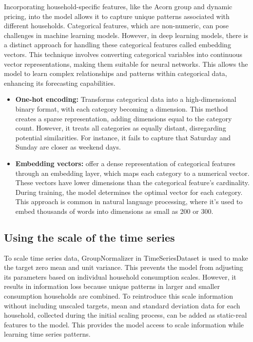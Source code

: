 \documentclass{article}
\begin{document}
Incorporating household-specific features, like the Acorn group and dynamic pricing, into the model allows it to capture unique patterns associated with different households. Categorical features, which are non-numeric, can pose challenges in machine learning models. However, in deep learning models, there is a distinct approach for handling these categorical features called embedding vectors. This technique involves converting categorical variables into continuous vector representations, making them suitable for neural networks. This allows the model to learn complex relationships and patterns within categorical data, enhancing its forecasting capabilities.
\begin{itemize}
    \item \textbf{One-hot encoding: } Transforms categorical data into a high-dimensional binary format, with each category becoming a dimension. This method creates a sparse representation, adding dimensions equal to the category count. However, it treats all categories as equally distant, disregarding potential similarities. For instance, it fails to capture that Saturday and Sunday are closer as weekend days.
    \item \textbf{Embedding vectors: } offer a dense representation of categorical features through an embedding layer, which maps each category to a numerical vector. These vectors have lower dimensions than the categorical feature's cardinality. During training, the model determines the optimal vector for each category. This approach is common in natural language processing, where it's used to embed thousands of words into dimensions as small as 200 or 300.
\end{itemize}




\subsection{Using the scale of the time series}

To scale time series data, GroupNormalizer in TimeSeriesDataset is used to make the target zero mean and unit variance. This prevents the model from adjusting its parameters based on individual household consumption scales. However, it results in information loss because unique patterns in larger and smaller consumption households are combined. To reintroduce this scale information without including unscaled targets, mean and standard deviation data for each household, collected during the initial scaling process, can be added as static-real features to the model. This provides the model access to scale information while learning time series patterns.
\end{document}
